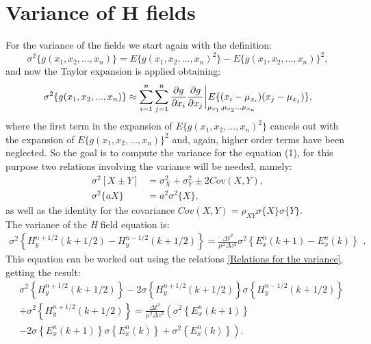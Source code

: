 \documentclass[12pt, oneside]{book}
\begin{document}
\section{Variance of H fields}
For the variance of the fields we start again with the definition:
\begin{equation}
\sigma^2 \lbrace g(x_1,x_2,...,x_n)\rbrace = E\lbrace g(x_1,x_2,...,x_n)^2\rbrace - E\lbrace g(x_1,x_2,...,x_n)\rbrace ^2,
\end{equation}
and now the Taylor expansion is applied obtaining:
\begin{equation}
\sigma^2 \lbrace g(x_1,x_2,...,x_n)\rbrace \approx \sum_{i=1}^n\sum_{j=1}^n \frac{\partial g}{\partial x_i}\frac{\partial g}{\partial x_j} \bigg |_{\mathrlap{\mu_{x_1},\mu_{x_2}...\mu_{x_n}}} E\lbrace(x_i-\mu_{x_i})(x_j-\mu_{x_j})\rbrace,
\end{equation}
where the first term in the expansion of $E\lbrace g(x_1,x_2,...,x_n)^2\rbrace$ cancels out with the expansion of $E\lbrace g(x_1,x_2,...,x_n)\rbrace ^2$ and, again, higher order terms have been neglected.
So the goal is to compute the variance for the equation (1), for this purpose two relations involving the variance will be needed, namely:
\begin{equation}\label{Relations for the variance}
\begin{split}
\sigma^2\left[X\pm Y\right] & =\sigma_X^2+\sigma_Y^2\pm 2\textit{Cov}(X,Y), \\
\sigma^2\lbrace aX \rbrace  & = a^2 \sigma^2 \lbrace X \rbrace,
\end{split}
\end{equation}
as well as the identity for the covariance $\textit{Cov}(X,Y)=\rho_{XY}\sigma\lbrace X \rbrace \sigma\lbrace Y\rbrace$. \\
\indent The variance of the \textit{H} field equation is:
\begin{equation}
\begin{split}
\sigma^2\left\lbrace H_y^{n+1/2}(k+1/2)-H_y^{n-1/2}(k+1/2)\right\rbrace = \frac{\Delta t^2}{\mu^2 \Delta z^2}\sigma^2\left\lbrace E_x^n(k+1)-E_x^n(k)\right\rbrace
\end{split}.
\end{equation}
This equation can be worked out using the relations \ref{Relations for the variance}, getting the result:
\begin{equation}
\begin{split}
& \sigma^2\left\lbrace H_y^{n+1/2}(k+1/2)\right\rbrace-2\sigma\left\lbrace H_y^{n+1/2}(k+1/2)\right\rbrace \sigma\left\lbrace H_y^{n-1/2}(k+1/2)\right\rbrace \\
&+ \sigma^2\left\lbrace H_y^{n+1/2}(k+1/2)\right\rbrace=\frac{\Delta t^2}{\mu^2 \Delta z^2} \left(\sigma^2\left\lbrace E_x^n(k+1)\right\rbrace \right. \\
& \left. -2\sigma\left\lbrace E_x^n(k+1)\right\rbrace \sigma\left\lbrace E_x^n(k)\right\rbrace + \sigma^2 \left\lbrace E_x^n(k)\right\rbrace \right).
\end{split}
\end{equation}
\end{document}
